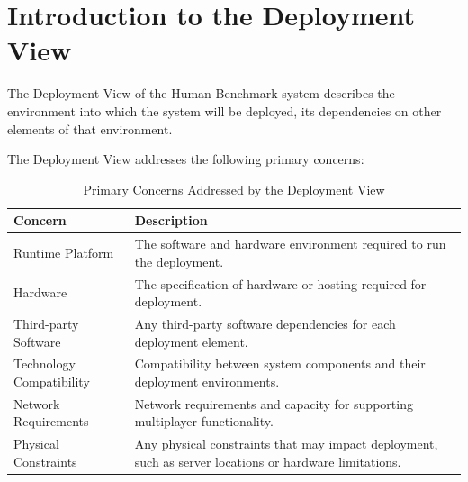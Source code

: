 

% 


\section{Introduction to the Deployment View}
The Deployment View of the Human Benchmark system describes the environment into
which the system will be deployed, its dependencies on other elements of that
environment.

The Deployment View addresses the following primary concerns:
\begin{table}[H]
    \centering
    \begin{tabular}{|p{}|p{}|}
        \hline
        \textbf{Concern}         & \textbf{Description}                                                                                   \\
        \hline
        Runtime Platform         & The software and hardware environment required to run the deployment.                                  \\
        \hline
        Hardware                 & The specification of hardware or hosting required for deployment.                                      \\
        \hline
        Third-party Software     & Any third-party software dependencies for each deployment element.                                     \\
        \hline
        Technology Compatibility & Compatibility between system components and their deployment environments.                             \\
        \hline
        Network Requirements     & Network requirements and capacity for supporting multiplayer functionality.                            \\
        \hline
        Physical Constraints     & Any physical constraints that may impact deployment, such as server locations or hardware limitations. \\
        \hline
    \end{tabular}
    \caption{Primary Concerns Addressed by the Deployment View}
    \label{tab:deployment_view_concerns}
\end{table}

